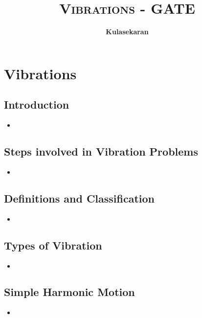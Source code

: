\documentclass[8pt]{report}
\title{\Huge{\textsc{Vibrations - GATE}}}
\author{\huge{\textbf{Kulasekaran}}}
\begin{document}
\maketitle
\tableofcontents
\chapter{Vibrations}
\section{Introduction}
	\begin{itemize}
		\item
	\end{itemize}\hrulefill
\section{Steps involved in Vibration Problems}
	\begin{itemize}
		\item
	\end{itemize}\hrulefill
\section{Definitions and Classification}
	\begin{itemize}
		\item
	\end{itemize}\hrulefill
\section{Types of Vibration}
	\begin{itemize}
		\item
	\end{itemize}\hrulefill
\section{Simple Harmonic Motion}
	\begin{itemize}
		\item
	\end{itemize}\hrulefill
\end{document}
